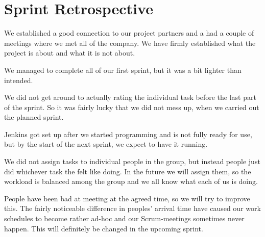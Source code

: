 \section{Sprint Retrospective}

We established a good connection to our project partners and a had a
couple of meetings where we met all of the company. We have firmly
established what the project is about and what it is not about. 

We managed to complete all of our first sprint, but it was a bit
lighter than intended.

We did not get around to actually rating the individual task before the
last part of the sprint. So it was fairly lucky that we did not mess up,
when we carried out the planned sprint. 

Jenkins got set up after we started programming and is not fully ready
for use, but by the start of the next sprint, we expect to have it
running.

We did not assign tasks to individual people in the group, but instead
people just did whichever task the felt like doing. In the future we will
assign them, so the workload is balanced among the group and we all know
what each of us is doing.

People have been bad at meeting at the agreed time, so we will try to
improve this. The fairly noticeable difference in peoples' arrival
time have caused our work schedules to become rather ad-hoc and our
Scrum-meetings sometimes never happen. This will definitely be changed in
the upcoming sprint.



